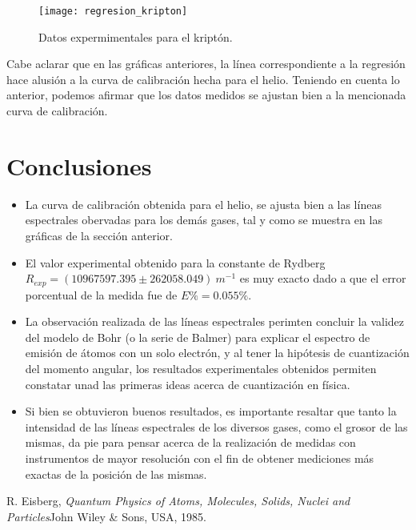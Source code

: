 \documentclass[prb,aps,twocolumn,preprintnumbers,amsmath,amssymb]{revtex4}
\begin{document}
\begin{figure}[h!]
	\centering
	\texttt{[image: regresion\_kripton]}
	\caption{Datos expermimentales para el kriptón.}
\end{figure}

Cabe aclarar que en las gráficas anteriores, la línea correspondiente a la regresión hace alusión a la curva de calibración hecha para el helio. Teniendo en cuenta lo anterior, podemos afirmar que los datos medidos se ajustan bien a la mencionada curva de calibración.

\section{Conclusiones}

\begin{itemize}

	\item La curva de calibración obtenida para el helio, se ajusta bien a las líneas espectrales obervadas para los demás gases, tal y como se muestra en las gráficas de la sección anterior.
	
	\item El valor experimental obtenido para la constante de Rydberg $R_{exp} = (10967597.395 \pm 262058.049)\ m^{-1}$ es muy exacto dado a que el error porcentual de la medida fue de $E\% = 0.055\%$.
		
	\item La observación realizada de las líneas espectrales perimten concluir la validez del modelo de Bohr (o la serie de Balmer) para explicar el espectro de emisión de átomos con un solo electrón, y al tener la hipótesis de cuantización del momento angular, los resultados experimentales obtenidos permiten constatar unad las primeras ideas acerca de cuantización en física.
	
	\item Si bien se obtuvieron buenos resultados, es importante resaltar que tanto la intensidad de las líneas espectrales de los diversos gases, como el grosor de las mismas, da pie para pensar acerca de la realización de medidas con instrumentos de mayor resolución con el fin de obtener mediciones más exactas de la posición de las mismas.
	
\end{itemize}

\begin{thebibliography}{99}
 R. Eisberg, {\it Quantum Physics of Atoms, Molecules, Solids, Nuclei and Particles}{John Wiley \& Sons, USA, 1985}.\\
\end{thebibliography}
\end{document}
